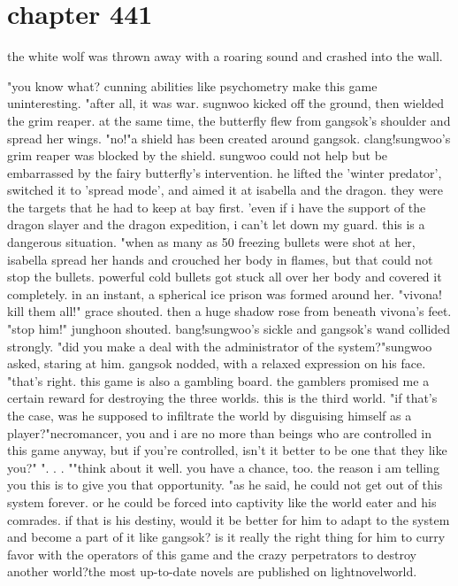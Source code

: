 \section{chapter 441}

the white wolf was thrown away with a roaring sound and crashed into the wall.





"you know what? cunning abilities like psychometry make this game uninteresting.
"after all, it was war.
sugnwoo kicked off the ground, then wielded the grim reaper.
 at the same time, the butterfly flew from gangsok's shoulder and spread her wings.
"no!"a shield has been created around gangsok.
clang!sungwoo's grim reaper was blocked by the shield.
 sungwoo could not help but be embarrassed by the fairy butterfly's intervention.
he lifted the 'winter predator', switched it to 'spread mode', and aimed it at isabella and the dragon.
 they were the targets that he had to keep at bay first.
'even if i have the support of the dragon slayer and the dragon expedition, i can't let down my guard.
 this is a dangerous situation.
"when as many as 50 freezing bullets were shot at her, isabella spread her hands and crouched her body in flames, but that could not stop the bullets.
 powerful cold bullets got stuck all over her body and covered it completely.
 in an instant, a spherical ice prison was formed around her.
"vivona! kill them all!" grace shouted.
then a huge shadow rose from beneath vivona's feet.
"stop him!" junghoon shouted.
bang!sungwoo's sickle and gangsok's wand collided strongly.
"did you make a deal with the administrator of the system?"sungwoo asked, staring at him.
 gangsok nodded, with a relaxed expression on his face.
"that's right.
 this game is also a gambling board.
 the gamblers promised me a certain reward for destroying the three worlds.
 this is the third world.
"if that's the case, was he supposed to infiltrate the world by disguising himself as a player?"necromancer, you and i are no more than beings who are controlled in this game anyway, but if you're controlled, isn't it better to be one that they like you?"
".
.
.
""think about it well.
 you have a chance, too.
 the reason i am telling you this is to give you that opportunity.
"as he said, he could not get out of this system forever.
 or he could be forced into captivity like the world eater and his comrades.
if that is his destiny, would it be better for him to adapt to the system and become a part of it like gangsok? is it really the right thing for him to curry favor with the operators of this game and the crazy perpetrators to destroy another world?the most up-to-date novels are published on lightnovelworld.
